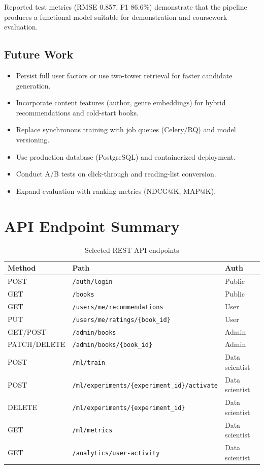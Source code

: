 \documentclass[12pt,a4paper]{report}
\begin{document}
Reported test metrics (RMSE 0.857, F1 86.6\%) demonstrate that the pipeline produces a functional model suitable for demonstration and coursework evaluation.

\section{Future Work}
\begin{itemize}
    \item Persist full user factors or use two-tower retrieval for faster candidate generation.
    \item Incorporate content features (author, genre embeddings) for hybrid recommendations and cold-start books.
    \item Replace synchronous training with job queues (Celery/RQ) and model versioning.
    \item Use production database (PostgreSQL) and containerized deployment.
    \item Conduct A/B tests on click-through and reading-list conversion.
    \item Expand evaluation with ranking metrics (NDCG@K, MAP@K).
\end{itemize}

\clearpage
\appendix
\chapter{API Endpoint Summary}

\begin{table}[htbp]
\centering
\small
\caption{Selected REST API endpoints}
\begin{tabular}{@{}lll@{}}
\toprule
\textbf{Method} & \textbf{Path} & \textbf{Auth} \\
\midrule
POST & \texttt{/auth/login} & Public \\
GET & \texttt{/books} & Public \\
GET & \texttt{/users/me/recommendations} & User \\
PUT & \texttt{/users/me/ratings/\{book\_id\}} & User \\
GET/POST & \texttt{/admin/books} & Admin \\
PATCH/DELETE & \texttt{/admin/books/\{book\_id\}} & Admin \\
POST & \texttt{/ml/train} & Data scientist \\
POST & \texttt{/ml/experiments/\{experiment\_id\}/activate} & Data scientist \\
DELETE & \texttt{/ml/experiments/\{experiment\_id\}} & Data scientist \\
GET & \texttt{/ml/metrics} & Data scientist \\
GET & \texttt{/analytics/user-activity} & Data scientist \\
\bottomrule
\end{tabular}
\end{table}
\end{document}
